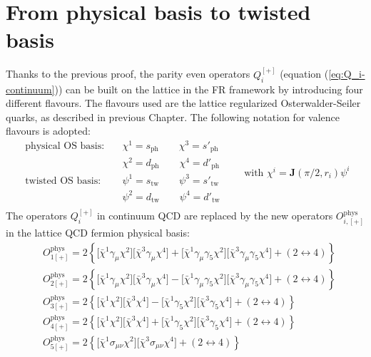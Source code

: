 \documentclass[english, LaM, oneside, noexaminfo]{sapthesis}
\begin{document}
\section{From physical basis to twisted basis}
\noindent
Thanks to the previous proof, the parity even operators $Q_{i}^{[+]}$ (equation (\ref{eq:Q_i-continuum})) can be built on the lattice in the FR framework by introducing four different flavours.
The flavours used are the lattice regularized Osterwalder-Seiler quarks, as described in previous Chapter.
The following notation for valence flavours is adopted:
\begin{equation*}
    \begin{aligned}
        \text{physical OS basis:}
        & \quad \chi^1 = s_\text{ph} \qquad \chi^3 = s'_\text{ph} \\
        & \quad \chi^2 = d_\text{ph} \qquad \chi^4 = d'_\text{ph} \\
        \text{twisted OS basis: }
        & \quad \psi^1 = s_\text{tw} \qquad \psi^3 = s'_\text{tw} \\
        & \quad \psi^2 = d_\text{tw} \qquad \psi^4 = d'_\text{tw} \\
    \end{aligned}
    \qquad
    \text{with } \chi^i = \mathbf{J}(\pi/2,r_i)\psi^i
\end{equation*}
The operators $Q_{i}^{[+]}$ in continuum QCD are replaced by the new operators $O_{i,[+]}^\text{phys}$ in the lattice QCD fermion physical basis:
\begin{equation*}
    \begin{split}
        & O_{1[+]}^\text{phys} = 2 \left\{\big[\bar\chi^1 \gamma_\mu \chi^2 \big] \big[\bar\chi^3 \gamma_\mu \chi^4 \big] + \big[ \bar\chi^1 \gamma_\mu \gamma_5 \chi^2 \big] \big[ \bar\chi^3 \gamma_\mu \gamma_5 \chi^4 \big] + \left(2\leftrightarrow 4\right)\right\} \\
        & O_{2[+]}^\text{phys} = 2 \left\{\big[\bar\chi^1 \gamma_\mu \chi^2 \big] \big[\bar\chi^3 \gamma_\mu \chi^4 \big] - \big[ \bar\chi^1 \gamma_\mu \gamma_5 \chi^2 \big] \big[ \bar\chi^3 \gamma_\mu \gamma_5 \chi^4 \big] + \left(2\leftrightarrow 4\right)\right\} \\
        & O_{3[+]}^\text{phys} = 2 \left\{\big[\bar\chi^1 \chi^2 \big] \big[ \bar\chi^3 \chi^4 \big] - \big[ \bar\chi^1 \gamma_5 \chi^2 \big] \big[ \bar\chi^3 \gamma_5 \chi^4\big] + \left(2\leftrightarrow 4\right)\right\} \\
        & O_{4[+]}^\text{phys} = 2 \left\{\big[\bar\chi^1 \chi^2 \big] \big[ \bar\chi^3 \chi^4 \big] + \big[ \bar\chi^1 \gamma_5 \chi^2 \big] \big[ \bar\chi^3 \gamma_5 \chi^4\big] + \left(2\leftrightarrow 4\right)\right\} \\
        & O_{5[+]}^\text{phys} = 2 \left\{\big[\bar\chi^1 \sigma_{\mu\nu} \chi^2 \big] \big[ \bar\chi^3 \sigma_{\mu\nu} \chi^4 \big] + \left(2\leftrightarrow 4\right)\right\} \\
    \end{split}
\end{equation*}
\end{document}
